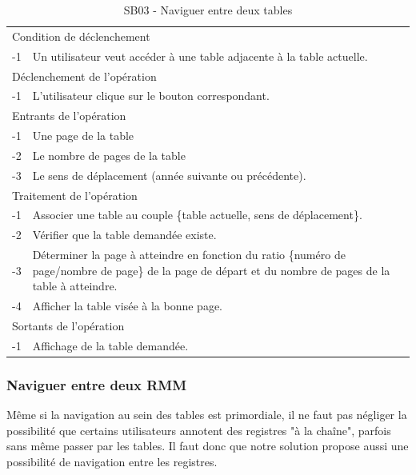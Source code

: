 \documentclass[a4paper]{article}
\begin{document}
\begin{table}[H]
  \centering
   \small
	\begin{tabular}{|c|p{12cm}|}
   		\hline
   			\rowcolor{lightgray}\multicolumn{2}{|c|}{\textbf{SB03 - Naviguer entre deux tables}} \\
   		\hline
   			\multicolumn{2}{|l|}{Condition de d\'eclenchement} \\
   		\hline
   		-1 & Un utilisateur veut acc\'eder \`a une table adjacente à la table actuelle. \\
   		\hline
   			\multicolumn{2}{|l|}{D\'eclenchement de l'op\'eration} \\
   		\hline
   			-1 & L'utilisateur clique sur le bouton correspondant. \\
   		\hline
   			\multicolumn{2}{|l|}{Entrants de l'op\'eration} \\
   		\hline
   			-1 & Une page de la table \\
        	-2 & Le nombre de pages de la table \\ 
            -3 & Le sens de déplacement (année suivante ou précédente). \\
   		\hline
   			\multicolumn{2}{|l|}{Traitement de l'op\'eration} \\
  		\hline
   			-1 & Associer une table au couple \{table actuelle, sens de d\'eplacement\}.  \\
        	-2 & V\'erifier que la table demand\'ee existe. \\
        	-3 & Déterminer la page à atteindre en fonction du ratio \{numéro de page/nombre de page\} de la page de départ et du nombre de pages de la table à atteindre. \\
            -4 & Afficher la table visée à la bonne page. \\
   		\hline
   			\multicolumn{2}{|l|}{Sortants de l'op\'eration} \\
   		\hline
   			-1 & Affichage de la table demand\'ee. \\
   		\hline
	\end{tabular}
  \caption{SB03 - Naviguer entre deux tables}
  \normalsize
  \label{tab:naviguer_deux_tables}
\end{table}


\subsubsection{Naviguer entre deux RMM}

Même si la navigation au sein des tables est primordiale, il ne faut pas négliger la possibilité que certains utilisateurs annotent des registres "à la chaîne", parfois sans même passer par les tables. Il faut donc que notre solution propose aussi une possibilité de navigation entre les registres.
\end{document}
